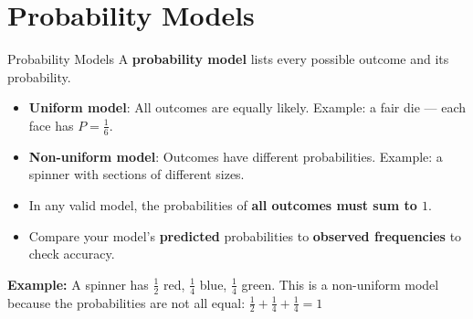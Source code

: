 \section{Probability Models}

\begin{quickReview}{Probability Models}
A \textbf{probability model} lists every possible outcome and its probability.

\begin{itemize}[leftmargin=*]
    \item \textbf{Uniform model}: All outcomes are equally likely. Example: a fair die — each face has $P = \frac{1}{6}$.
    \item \textbf{Non-uniform model}: Outcomes have different probabilities. Example: a spinner with sections of different sizes.
    \item In any valid model, the probabilities of \textbf{all outcomes must sum to $1$}.
    \item Compare your model's \textbf{predicted} probabilities to \textbf{observed frequencies} to check accuracy.
\end{itemize}

\medskip
\textbf{Example:} A spinner has $\frac{1}{2}$ red, $\frac{1}{4}$ blue, $\frac{1}{4}$ green. This is a non-uniform model because the probabilities are not all equal: $\frac{1}{2} + \frac{1}{4} + \frac{1}{4} = 1$ \checkmark
\end{quickReview}

